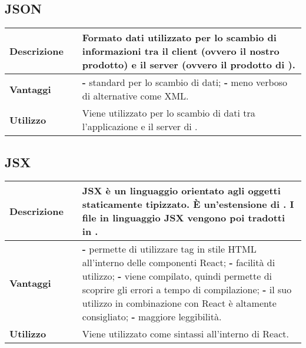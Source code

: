 \vspace{40px}
\subsection{JSON}
\label{JSON}
\begin{table}[H]
	\centering
	\begin{tabular}{p{2cm}p{0.5cm}p{11.5cm}}
		\arrayrulecolor{lightgray}
		\toprule
		\textbf{Descrizione} & &
		Formato dati utilizzato per lo scambio di informazioni tra il client (ovvero il nostro prodotto) e il server (ovvero il prodotto di \riskapp).
		\\ \midrule
		\textbf{Vantaggi} & &
		\textbf{- } standard per lo scambio di dati;
		\newline
		\textbf{- } meno verboso di alternative come XML.
		\\ \midrule
		\textbf{Utilizzo} & &
		Viene utilizzato per lo scambio di dati tra l'applicazione \progetto e il server di \riskapp.
		\\ \bottomrule
	\end{tabular}
\end{table}


\newpage
\subsection{JSX}
\label{JSX}
\begin{table}[H]
	\centering
	\begin{tabular}{p{2cm}p{0.5cm}p{11.5cm}}
		\arrayrulecolor{lightgray}
		\toprule
		\textbf{Descrizione} & &
		JSX è un linguaggio orientato agli oggetti staticamente tipizzato. È un'estensione di \js.
		I file in linguaggio JSX vengono poi tradotti in \js.
		\\ \midrule
		\textbf{Vantaggi} & &
		\textbf{- }permette di utilizzare tag in stile HTML all'interno delle componenti React;
		\newline
		\textbf{- }facilità di utilizzo;
		\newline
		\textbf{- }viene compilato, quindi permette di scoprire gli errori a tempo di compilazione;
		\newline
		\textbf{- }il suo utilizzo in combinazione con React è altamente consigliato;
		\newline
		\textbf{- } maggiore leggibilità.
		\\ \midrule
		\textbf{Utilizzo} & &
		Viene utilizzato come sintassi all'interno di React.
		\\ \bottomrule
	\end{tabular}
\end{table}


